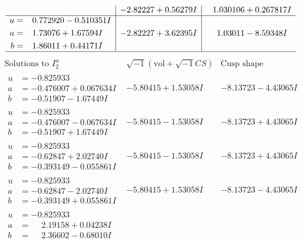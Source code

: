 \documentclass[1p]{elsarticle_modified}
\theoremstyle{definition}
\newcommand{\I}{\sqrt{-1}}
\begin{document}
$$\begin{array}{c|c|c}
 & -2.82227 + 0.56279 I & \phantom{-}1.030106 + 0.267817 I \\ \hline\begin{aligned}
u &= \phantom{-}0.772920 - 0.510351 I \\
a &= \phantom{-}1.73076 + 1.67594 I \\
b &= \phantom{-}1.86011 + 0.44171 I\end{aligned}
 & -2.82227 + 3.62395 I & \phantom{-}1.03011 - 8.59348 I\\
 \hline 
 \end{array}$$\newpage$$\begin{array}{c|c|c}  
\text{Solutions to }I^u_{2}& \I (\text{vol} + \sqrt{-1}CS) & \text{Cusp shape}\\
 \hline 
\begin{aligned}
u &= -0.825933\phantom{ +0.000000I} \\
a &= -0.476007 + 0.067634 I \\
b &= -0.51907 - 1.67449 I\end{aligned}
 & -5.80415 + 1.53058 I & -8.13723 - 4.43065 I \\ \hline\begin{aligned}
u &= -0.825933\phantom{ +0.000000I} \\
a &= -0.476007 - 0.067634 I \\
b &= -0.51907 + 1.67449 I\end{aligned}
 & -5.80415 - 1.53058 I & -8.13723 + 4.43065 I \\ \hline\begin{aligned}
u &= -0.825933\phantom{ +0.000000I} \\
a &= -0.62847 + 2.02740 I \\
b &= -0.393149 - 0.055861 I\end{aligned}
 & -5.80415 - 1.53058 I & -8.13723 + 4.43065 I \\ \hline\begin{aligned}
u &= -0.825933\phantom{ +0.000000I} \\
a &= -0.62847 - 2.02740 I \\
b &= -0.393149 + 0.055861 I\end{aligned}
 & -5.80415 + 1.53058 I & -8.13723 - 4.43065 I \\ \hline\begin{aligned}
u &= -0.825933\phantom{ +0.000000I} \\
a &= \phantom{-}2.19158 + 0.04238 I \\
b &= \phantom{-}2.36602 - 0.68010 I\end{aligned}

\end{array}$$
\end{document}

